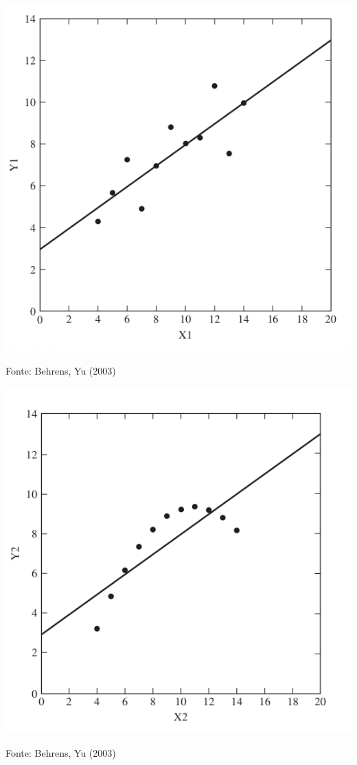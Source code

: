 \documentclass{beamer}
\begin{document}
\begin{frame}
  \begin{center}
    \includegraphics[height=0.7\textheight]{EDA/eda-dispersao1}
  \end{center}
  Fonte: Behrens, Yu (2003)
\end{frame}

\begin{frame}
  \begin{center}
    \includegraphics[height=0.7\textheight]{EDA/eda-dispersao2}
  \end{center}
  Fonte: Behrens, Yu (2003)
\end{frame}
\end{document}
